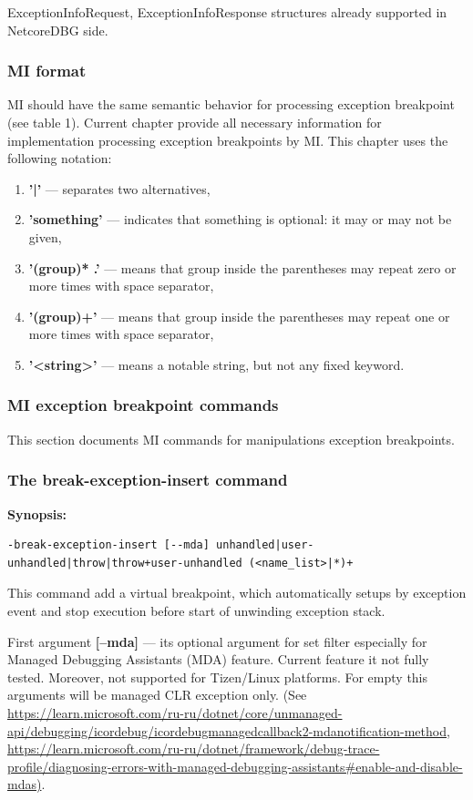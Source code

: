 \documentclass[a4paper,12pt]{article}
\newenvironment{nobr}{\begin{minipage}{\textwidth}\setlength\parskip{1em}
}{\end{minipage}\ignorespacesafterend}
\begin{document}
ExceptionInfoRequest, ExceptionInfoResponse structures already supported in NetcoreDBG side.

\subsubsection{MI format}
MI should have the same semantic behavior for processing exception breakpoint (see table 1). Current chapter provide all necessary information for implementation processing exception breakpoints by MI. This chapter uses the following notation:
\begin{enumerate}
 \item \textbf{'|'} --- separates two alternatives,
 \item \textbf{'something'} --- indicates that something is optional: it may or may not be given,
 \item \textbf{'(group)* .'} --- means that group inside the parentheses may repeat zero or more times with space separator,
 \item \textbf{'(group)+'} --- means that group inside the parentheses may repeat one or more times with space separator,
 \item \textbf{'<string>'} --- means a notable string, but not any fixed keyword.
\end{enumerate}

\subsubsection{MI exception breakpoint commands}
This section documents MI commands for manipulations exception breakpoints.

\begin{nobr}
\subsubsection{The break-exception-insert command}
\textbf{Synopsis:}
\begin{lstlisting}[style=cplusplus,numbers=none]
-break-exception-insert [--mda] unhandled|user-unhandled|throw|throw+user-unhandled (<name_list>|*)+
\end{lstlisting}
\end{nobr}

This command add a virtual breakpoint, which automatically setups by exception event and stop execution before start of unwinding exception stack.

First argument \textbf{[--mda]} --- its optional argument for set filter especially for Managed Debugging Assistants (MDA) feature. Current feature it not fully tested. Moreover, not supported for Tizen/Linux platforms. For empty this arguments will be managed CLR exception only. (See \url{https://learn.microsoft.com/ru-ru/dotnet/core/unmanaged-api/debugging/icordebug/icordebugmanagedcallback2-mdanotification-method}, \url{https://learn.microsoft.com/ru-ru/dotnet/framework/debug-trace-profile/diagnosing-errors-with-managed-debugging-assistants#enable-and-disable-mdas)}.
\end{document}
